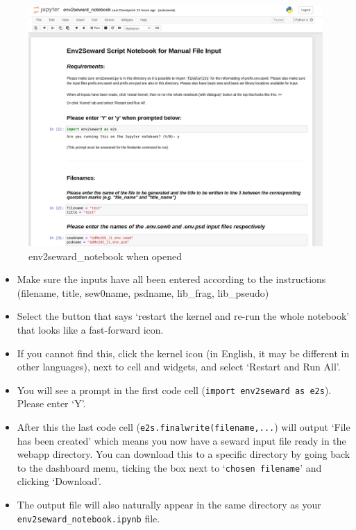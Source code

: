 \begin{figure}
	\centering
	\includegraphics[width=1.3\linewidth]{../manuals/e2s_disp_manual/notebook.png}
	\caption{env2seward\_notebook when opened}
	\label{fig:screenshot-from-2020-06-23-12-26-25}
\end{figure}



\begin{itemize}
	\item Make sure the inputs have all been entered according to the instructions (filename, title, sew0name, psdname, lib\_frag, lib\_pseudo)
	\item Select the button that says `restart the kernel and re-run the whole notebook' that looks like a fast-forward icon.
	\item If you cannot find this, click the kernel icon (in English, it may be different in other languages), next to cell and widgets, and select `Restart and Run All'.
	\item You will see a prompt in the first code cell (\texttt{import env2seward as e2s}). Please enter `Y'.
	\item After this the last code cell (\texttt{e2s.finalwrite(filename,...}) will output `File has been created' which means you now have a seward input file ready in the webapp directory. You can download this to a specific directory by going back to the dashboard menu, ticking the box next to `\texttt{chosen filename}' and clicking `Download'.
	\item The output file will also naturally appear in the same directory as your \texttt{env2seward\_notebook.ipynb} file.
        \end{itemize}

